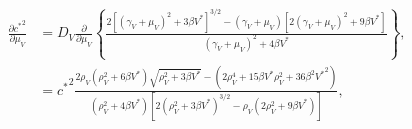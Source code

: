 \documentclass{article}
\begin{document}
\begin{equation}
  \begin{split}
    \frac{\partial {c^*}^2}{\partial \mu_V}
    &=
    D_V
    \frac{\partial}{\partial \mu_V} \left\{
      \frac{2 \left[(\gamma_V + \mu_V)^2 + 3 \beta V^*\right]^{3/2}
        - (\gamma_V + \mu_V) \left[2 (\gamma_V + \mu_V)^2 + 9 \beta V^*\right]}
      {(\gamma_V + \mu_V)^2 + 4 \beta V^*}
    \right\},
    \\
    &=
    {c^*}^2
    \frac{
      2 \rho_V
      \left(\rho_V^2 + 6 \beta V^*\right)
      \sqrt{\rho_V^2 + 3 \beta V^*}
      - \left(
        2 \rho_V^4
        + 15 \beta V^* \rho_V^2
        + 36 \beta^2 {V^*}^2
      \right)
    }
    {\left(\rho_V^2 + 4 \beta V^*\right)
    \left[2 \left(\rho_V^2 + 3 \beta V^*\right)^{3/2}
      - \rho_V \left(2 \rho_V^2 + 9 \beta V^*\right)\right]},
  \end{split}
\end{equation}
\end{document}
